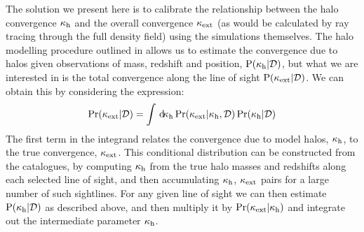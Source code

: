 \documentclass[useAMS,usenatbib,a4paper]{mn2e}
\begin{document}
The solution we present here is to calibrate the relationship between the halo
convergence $\kappa_{\rm h}$ and the overall convergence $\kappa_{\rm ext}$ (as would be
calculated by ray tracing through the full density field)  using the
simulations themselves. The halo modelling procedure outlined in
 allows  us to estimate  the convergence due to halos
given observations of  mass, redshift and position,
${\rm P}(\kappa_{\rm h}|{\mathcal{D}})$, but what we are interested in is the total
convergence along the line of sight ${\rm P}(\kappa_{\rm ext}|{\mathcal{D}})$. We can obtain
this by considering the expression: 
\begin{equation} 
\Pr(\kappa_{\rm ext}|{\mathcal{D}}) = 
   \int \, \mathrm{d} \!\kappa_{\rm h}  \Pr(\kappa_{\rm ext}|\kappa_{\rm h},{\mathcal{D}}) \Pr(\kappa_{\rm h}|{\mathcal{D}})
   \label{eq:kappaconv}
\end{equation} 
The first term in the integrand relates the convergence due to model halos,
$\kappa_{\rm h}$, to the true convergence, $\kappa_{\rm ext}$. This conditional distribution
can be constructed from the \MS catalogues, by computing
$\kappa_{\rm h}$ from the true halo masses and redshifts 
along each selected line of sight, and then
accumulating $\kappa_{\rm h}$, $\kappa_{\rm ext}$ pairs
for a large number of such sightlines. 
For any given line of sight we can then estimate
${\rm P}(\kappa_{\rm h}|{\mathcal{D}})$ as described above, and then multiply it by
$\Pr(\kappa_{\rm ext}|\kappa_{\rm h})$ and integrate out the intermediate parameter
$\kappa_{\rm h}$. 

\end{document}
